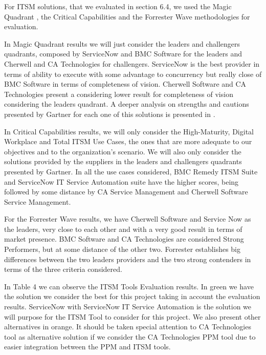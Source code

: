 For ITSM solutions, that we evaluated in section 6.4, we used the Magic Quadrant , the Critical Capabilities and the Forrester Wave methodologies for evaluation.\par
In Magic Quadrant results we will just consider the leaders and challengers quadrants, composed by ServiceNow and BMC Software for the leaders and Cherwell and CA Technologies for challengers. ServiceNow is the best provider in terms of ability to execute with some advantage to concurrency but really close of BMC Software in terms of completeness of vision. Cherwell Software and CA Technologies present a considering lower result for completeness of vision considering the leaders quadrant. A deeper analysis on strengths and cautions presented by Gartner for each one of this solutions is presented in \cite{magicQuadrantITSM}.\par
In Critical Capabilities results, we will only consider the High-Maturity, Digital Workplace and Total ITSM Use Cases, the ones that are more adequate to our objectives and to the organization's scenario. We will also only consider the solutions provided by the suppliers in the leaders and challengers quadrants presented by Gartner. In all the use cases considered, BMC Remedy ITSM Suite and ServiceNow IT Service Automation suite have the higher scores, being followed by some distance by CA Service Management and Cherwell Software Service Management.\par
For the Forrester Wave results, we have Cherwell Software and Service Now as the leaders, very close to each other and with a very good result in terms of market presence. BMC Software and CA Technologies are considered Strong Performers, but at some distance of the other two. Forrester establishes big differences between the two leaders providers and the two strong contenders in terms of the three criteria considered.\par
In Table 4 we can observe the ITSM Tools Evaluation results. In green we have the solution we consider the best for this project taking in account the evaluation results. ServiceNow with ServiceNow IT Service Automation is the solution we will purpose for the ITSM Tool to consider for this project. We also present other alternatives in orange. It should be taken special attention to CA Technologies tool as alternative solution if we consider the CA Technologies PPM tool due to easier integration between the PPM and ITSM tools.\par


